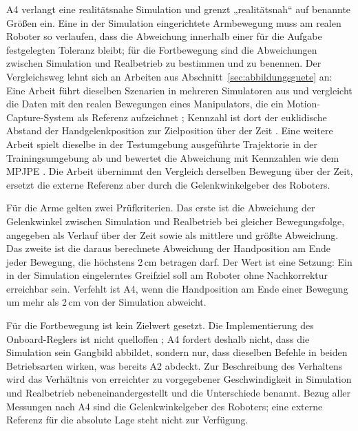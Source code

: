 A4 verlangt eine realitätsnahe Simulation und grenzt „realitätsnah“ auf benannte Größen ein.
Eine in der Simulation eingerichtete Armbewegung muss am realen Roboter so verlaufen, dass die Abweichung innerhalb einer für die Aufgabe festgelegten Toleranz bleibt; für die Fortbewegung sind die Abweichungen zwischen Simulation und Realbetrieb zu bestimmen und zu benennen.
Der Vergleichsweg lehnt sich an Arbeiten aus Abschnitt~\ref{sec:abbildungsguete} an: Eine Arbeit führt dieselben Szenarien in mehreren Simulatoren aus und vergleicht die Daten mit den realen Bewegungen eines Manipulators, die ein Motion-Capture-System als Referenz aufzeichnet \cite{Collins2019}; Kennzahl ist dort der euklidische Abstand der Handgelenkposition zur Zielposition über der Zeit \cite{Collins2019}.
Eine weitere Arbeit spielt dieselbe in der Testumgebung ausgeführte Trajektorie in der Trainingsumgebung ab und bewertet die Abweichung mit Kennzahlen wie dem MPJPE \cite{He2025}.
Die Arbeit übernimmt den Vergleich derselben Bewegung über der Zeit, ersetzt die externe Referenz aber durch die Gelenkwinkelgeber des Roboters.

Für die Arme gelten zwei Prüfkriterien.
Das erste ist die Abweichung der Gelenkwinkel zwischen Simulation und Realbetrieb bei gleicher Bewegungsfolge, angegeben als Verlauf über der Zeit sowie als mittlere und größte Abweichung. %
Das zweite ist die daraus berechnete Abweichung der Handposition am Ende jeder Bewegung, die höchstens 2\,cm betragen darf. %
Der Wert ist eine Setzung: Ein in der Simulation eingelerntes Greifziel soll am Roboter ohne Nachkorrektur erreichbar sein.
Verfehlt ist A4, wenn die Handposition am Ende einer Bewegung um mehr als 2\,cm von der Simulation abweicht.

Für die Fortbewegung ist kein Zielwert gesetzt.
Die Implementierung des Onboard-Reglers ist nicht quelloffen \cite{Hu2026}; A4 fordert deshalb nicht, dass die Simulation sein Gangbild abbildet, sondern nur, dass dieselben Befehle in beiden Betriebsarten wirken, was bereits A2 abdeckt.
Zur Beschreibung des Verhaltens wird das Verhältnis von erreichter zu vorgegebener Geschwindigkeit in Simulation und Realbetrieb nebeneinandergestellt und die Unterschiede benannt. %
Bezug aller Messungen nach A4 sind die Gelenkwinkelgeber des Roboters; eine externe Referenz für die absolute Lage steht nicht zur Verfügung.

